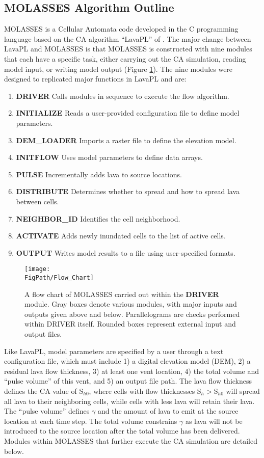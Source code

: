 	\subsection{MOLASSES Algorithm Outline}
		MOLASSES is a Cellular Automata code developed in the C programming language based on the CA algorithm ``LavaPL'' of \citet{connor2012probabilistic}. The major change between LavaPL and MOLASSES is that MOLASSES is constructed with nine modules that each have a specific task, either carrying out the CA simulation, reading model input, or writing model output (Figure \ref{fig_flowchart}). The nine modules were designed to replicated major functions in LavaPL and are:
		\begin{enumerate}
			\item{\textbf{DRIVER}} Calls modules in sequence to execute the flow algorithm.
			\item{\textbf{INITIALIZE}} Reads a user-provided configuration file to define model parameters.
			\item{\textbf{DEM\_LOADER}} Imports a raster file to define the elevation model.
			\item{\textbf{INITFLOW}} Uses model parameters to define data arrays.
			\item{\textbf{PULSE}} Incrementally adds lava to source locations.
			\item{\textbf{DISTRIBUTE}} Determines whether to spread and how to spread lava between cells.
			\item{\textbf{NEIGHBOR\_ID}} Identifies the cell neighborhood.
			\item{\textbf{ACTIVATE}} Adds newly inundated cells to the list of active cells.
			\item{\textbf{OUTPUT}} Writes model results to a file using user-specified formats.
		\end{enumerate}
		
		\begin{figure}[!h]
			\centering
			\texttt{[image: \\FigPath/Flow\_Chart]}
			\caption[MOLASSES flow chart]{A flow chart of MOLASSES carried out within the \textbf{DRIVER} module. Gray boxes denote various modules, with major inputs and outputs given above and below. Parallelograms are checks performed within DRIVER itself. Rounded boxes represent external input and output files.}
			\label{fig_flowchart}
		\end{figure}
		
		
		Like LavaPL, model parameters are specified by a user through a text configuration file, which must include 1) a digital elevation model (DEM), 2) a residual lava flow thickness, 3) at least one vent location, 4) the total volume and ``pulse volume'' of this vent, and 5) an output file path. The lava flow thickness defines the CA value of S$_{h0}$, where cells with flow thicknesses S$_h>$S$_{h0}$ will spread all lava to their neighboring cells, while cells with less lava will retain their lava. The ``pulse volume'' defines $\gamma$ and the amount of lava to emit at the source location at each time step. The total volume constrains $\gamma$ as lava will not be introduced to the source location after the total volume has been delivered. Modules within MOLASSES that further execute the CA simulation are detailed below.
		
